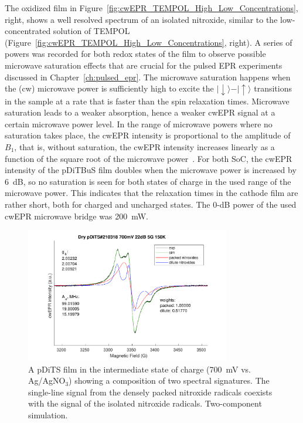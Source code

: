 The oxidized film in Figure~\ref{fig:cwEPR_TEMPOL_High_Low_Concentrations}, right, shows a well resolved spectrum of an isolated nitroxide, similar to the low-concentrated solution of TEMPOL (Figure~\ref{fig:cwEPR_TEMPOL_High_Low_Concentrations}, right). A series of powers was recorded for both redox states of the film to observe possible microwave saturation effects that are crucial for the pulsed EPR experiments discussed in Chapter~\ref{ch:pulsed_epr}. The microwave saturation happens when the (cw) microwave power is sufficiently high to excite the $\vert{\downarrow}\rangle-\vert{\uparrow}\rangle$ transitions in the sample at a rate that is faster than the spin relaxation times. Microwave saturation leads to a weaker absorption, hence a weaker cwEPR signal at a certain microwave power level. In the range of microwave powers where no saturation takes place, the cwEPR intensity is proportional to the amplitude of $B_1$, that is, without saturation, the cwEPR intensity increases linearly as a function of the square root of the microwave power~\cite{Eaton_book}. For both SoC, the cwEPR intensity of the pDiTBuS film doubles when the microwave power is increased by 6~dB, so no saturation is seen for both states of charge in the used range of the microwave power. This indicates that the relaxation times in the cathode film are rather short, both for charged and uncharged states. The 0-dB power of the used cwEPR microwave bridge was 200~mW.
\begin{figure}[]
\center
	\includegraphics[width=0.8\textwidth]{./operando_epr/figures/CRYO/cw_sim_pDiTS_210318_700mV_2comp.pdf}
	\caption{A pDiTS film in the intermediate state of charge (700~mV vs. Ag/AgNO$_3$) showing a composition of two spectral signatures. The single-line signal from the densely packed nitroxide radicals coexists with the signal of the isolated nitroxide radicals. Two-component simulation.}
	\label{fig:cwEPR_CRYO_DiTS_2_COMP_SIM}
\end{figure}

